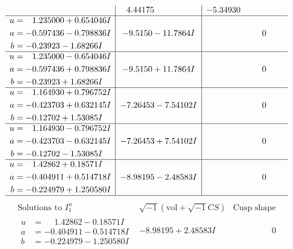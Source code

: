 \documentclass[1p]{elsarticle_modified}
\theoremstyle{definition}
\newcommand{\I}{\sqrt{-1}}
\begin{document}
$$\begin{array}{c|c|c}
 & \phantom{-}4.44175\phantom{ +0.000000I} & -5.34930\phantom{ +0.000000I} \\ \hline\begin{aligned}
u &= \phantom{-}1.235000 + 0.654046 I \\
a &= -0.597436 - 0.798836 I \\
b &= -0.23923 - 1.68266 I\end{aligned}
 & -9.5150 - 11.7864 I & \phantom{-0.000000 } 0 \\ \hline\begin{aligned}
u &= \phantom{-}1.235000 - 0.654046 I \\
a &= -0.597436 + 0.798836 I \\
b &= -0.23923 + 1.68266 I\end{aligned}
 & -9.5150 + 11.7864 I & \phantom{-0.000000 } 0 \\ \hline\begin{aligned}
u &= \phantom{-}1.164930 + 0.796752 I \\
a &= -0.423703 + 0.632145 I \\
b &= -0.12702 + 1.53085 I\end{aligned}
 & -7.26453 - 7.54102 I & \phantom{-0.000000 } 0 \\ \hline\begin{aligned}
u &= \phantom{-}1.164930 - 0.796752 I \\
a &= -0.423703 - 0.632145 I \\
b &= -0.12702 - 1.53085 I\end{aligned}
 & -7.26453 + 7.54102 I & \phantom{-0.000000 } 0 \\ \hline\begin{aligned}
u &= \phantom{-}1.42862 + 0.18571 I \\
a &= -0.404911 + 0.514718 I \\
b &= -0.224979 + 1.250580 I\end{aligned}
 & -8.98195 - 2.48583 I & \phantom{-0.000000 } 0\\
 \hline 
 \end{array}$$\newpage$$\begin{array}{c|c|c}  
\text{Solutions to }I^u_{1}& \I (\text{vol} + \sqrt{-1}CS) & \text{Cusp shape}\\
 \hline 
\begin{aligned}
u &= \phantom{-}1.42862 - 0.18571 I \\
a &= -0.404911 - 0.514718 I \\
b &= -0.224979 - 1.250580 I\end{aligned}
 & -8.98195 + 2.48583 I & \phantom{-0.000000 } 0 \\ \hline\begin{aligned}

\end{aligned}
\end{array}$$
\end{document}
